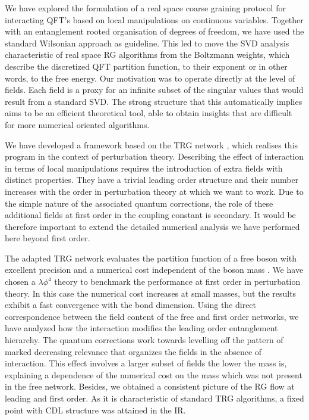\documentclass[a4paper,preprintnumbers,nofootinbib,twocolumn]{quantumarticle}
\begin{document}
We have explored the formulation of a real space coarse graining protocol for interacting QFT's based on local manipulations on continuous variables.
Together with an entanglement rooted organisation of degrees of freedom, we have used the standard Wilsonian approach as guideline.
This led to move the SVD analysis characteristic of real space RG algorithms from the Boltzmann weights, which describe the discretized QFT partition function, to their exponent or in other words, to the free energy. Our motivation was to operate directly at the level of fields. Each field is a proxy for an infinite subset of the singular values that would result from a standard SVD.
The strong structure that this automatically implies aims to be an efficient theoretical tool, able to obtain insights that are difficult for more numerical oriented algorithms.

We have developed a framework based on the TRG network \cite{LN07}, which realises this program in the context of perturbation theory. 
Describing the effect of interaction in terms of local manipulations requires the introduction of extra fields with distinct properties. They have a trivial leading order structure and their number increases 
with the order in perturbation theory at which we want to work.
Due to the simple nature of the associated quantum corrections,  the role of these additional fields at first order in the coupling constant is secondary.
It would be therefore important to extend the detailed numerical analysis we have performed here beyond first order.

The adapted TRG network evaluates the partition function of a free boson with excellent precision and a numerical cost independent of the boson mass  \cite{CS19}. 
We have chosen a $\lambda \phi^4$ theory to benchmark the performance at first order in perturbation theory. 
In this case the numerical cost increases at small masses, but the results exhibit a fast convergence with the bond dimension.
Using the direct correspondence between the field content of the free and first order networks, we have analyzed how the interaction modifies the leading order entanglement hierarchy.
The quantum corrections work towards levelling off the pattern of marked decreasing relevance that organizes the fields in the absence of interaction.
This effect involves a larger subset of fields the lower the mass is, explaining a dependence of the numerical cost on the mass which was not present in the free network.
Besides, we obtained a consistent picture of the RG flow at leading and first order. As it is characteristic of standard TRG algorithms, a fixed point with CDL structure was attained in the IR.
\end{document}
